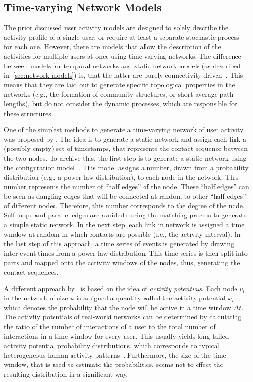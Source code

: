 \subsection{Time-varying Network Models}
\label{subsec:time-varying-network-models}

The prior discussed user activity models are designed to solely describe the activity profile of a single user, or require at least a separate stochastic process for each one.
However, there are models that allow the description of the activities for multiple users at once using time-varying networks.
The difference between models for temporal networks and static network models (as described in~\cref{sec:network-models}) is, that the latter are purely connectivity driven~\cite{Perra2012a}.
This means that they are laid out to generate specific topological properties in the networks (e.g., the formation of community structures, or short average path lengths), but do not consider the dynamic processes, which are responsible for these structures.

One of the simplest methods to generate a time-varying network of user activity was proposed by \citet{Holme2013}.
The idea is to generate a static network and assign each link a (possibly empty) set of timestamps, that represents the contact sequence between the two nodes.
To archive this, the first step is to generate a static network using the configuration model~\cite{Newman2010}.
This model assigns a number, drawn from a probability distribution (e.g., a power-law distribution), to each node in the network.
This number represents the number of \enquote{half edges} of the node.
These \enquote{half edges} can be seen as dangling edges that will be connected at random to other \enquote{half edges} of different nodes.
Therefore, this number corresponds to the degree of the node.
Self-loops and parallel edges are avoided during the matching process to generate a simple static network.
In the next step, each link in network is assigned a time window at random in which contacts are possible (i.e., the activity interval).
In the last step of this approach, a time series of events is generated by drawing inter-event times from a power-law distribution.
This time series is then split into parts and mapped onto the activity windows of the nodes, thus, generating the contact sequences.

A different approach by~\citet{Perra2012a} is based on the idea of \emph{activity potentials}.
Each node \(v_{i}\) in the network of size \( n \) is assigned a quantity called the activity potential \(x_{i}\), which denotes the probability that the node will be active in a time window \(\Delta t\).
The activity potentials of real-world networks can be determined by calculating the ratio of the number of interactions of a user to the total number of interactions in a time window for every user.
This usually yields long tailed activity potential probability distributions, which corresponds to typical heterogeneous human activity patterns~\cite{Vazquez2006, Jo2012}.
Furthermore, the size of the time window, that is used to estimate the probabilities, seems not to effect the resulting distribution in a significant way.

